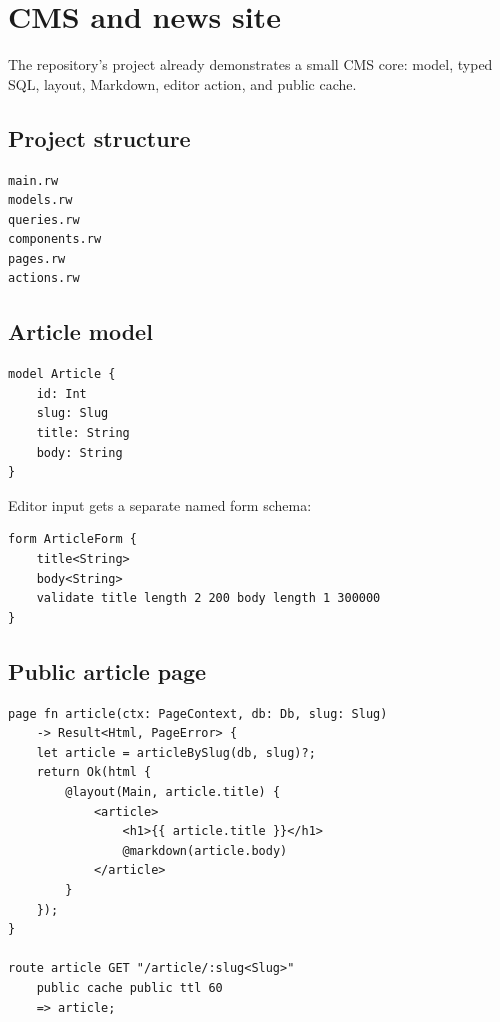 \section{CMS and news site}

The repository's  project already demonstrates a small CMS core: model, typed SQL, layout, Markdown, editor action, and public cache.

\subsection*{Project structure}

\begin{lstlisting}
main.rw
models.rw
queries.rw
components.rw
pages.rw
actions.rw
\end{lstlisting}

\subsection*{Article model}

\begin{lstlisting}[language=RWLang]
model Article {
    id: Int
    slug: Slug
    title: String
    body: String
}
\end{lstlisting}

Editor input gets a separate named form schema:

\begin{lstlisting}[language=RWLang]
form ArticleForm {
    title<String>
    body<String>
    validate title length 2 200 body length 1 300000
}
\end{lstlisting}

\subsection*{Public article page}

\begin{lstlisting}[language=RWLang]
page fn article(ctx: PageContext, db: Db, slug: Slug)
    -> Result<Html, PageError> {
    let article = articleBySlug(db, slug)?;
    return Ok(html {
        @layout(Main, article.title) {
            <article>
                <h1>{{ article.title }}</h1>
                @markdown(article.body)
            </article>
        }
    });
}

route article GET "/article/:slug<Slug>"
    public cache public ttl 60
    => article;
\end{lstlisting}


